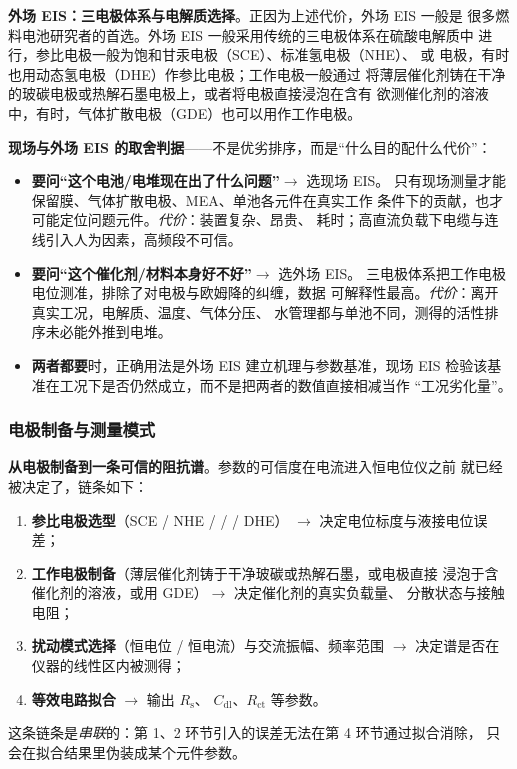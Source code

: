 \begin{measure}
\textbf{外场 EIS：三电极体系与电解质选择}。正因为上述代价，外场 EIS 一般是
很多燃料电池研究者的首选。外场 EIS 一般采用传统的三电极体系在硫酸电解质中
进行，参比电极一般为饱和甘汞电极（SCE）、标准氢电极（NHE）、
或  电极，有时也用动态氢电极（DHE）作参比电极；工作电极一般通过
将薄层催化剂铸在干净的玻碳电极或热解石墨电极上，或者将电极直接浸泡在含有
欲测催化剂的溶液中，有时，气体扩散电极（GDE）也可以用作工作电极。
\end{measure}

\begin{probout}
\textbf{现场与外场 EIS 的取舍判据}——不是优劣排序，而是“什么目的配什么代价”：

\begin{itemize}
  \item \textbf{要问“这个电池/电堆现在出了什么问题”}$\rightarrow$ 选现场 EIS。
        只有现场测量才能保留膜、气体扩散电极、MEA、单池各元件在真实工作
        条件下的贡献，也才可能定位问题元件。\emph{代价}：装置复杂、昂贵、
        耗时；高直流负载下电缆与连线引入人为因素，高频段不可信。
  \item \textbf{要问“这个催化剂/材料本身好不好”}$\rightarrow$ 选外场 EIS。
        三电极体系把工作电极电位测准，排除了对电极与欧姆降的纠缠，数据
        可解释性最高。\emph{代价}：离开真实工况，电解质、温度、气体分压、
        水管理都与单池不同，测得的活性排序未必能外推到电堆。
  \item \textbf{两者都要}时，正确用法是外场 EIS 建立机理与参数基准，现场 EIS
        检验该基准在工况下是否仍然成立，而不是把两者的数值直接相减当作
        “工况劣化量”。
\end{itemize}
\end{probout}

\subsubsection{电极制备与测量模式}

\begin{dataflow}
\textbf{从电极制备到一条可信的阻抗谱}。参数的可信度在电流进入恒电位仪之前
就已经被决定了，链条如下：

\begin{enumerate}
  \item \textbf{参比电极选型}（SCE / NHE /  /  / DHE）
        $\rightarrow$ 决定电位标度与液接电位误差；
  \item \textbf{工作电极制备}（薄层催化剂铸于干净玻碳或热解石墨，或电极直接
        浸泡于含催化剂的溶液，或用 GDE）$\rightarrow$ 决定催化剂的真实负载量、
        分散状态与接触电阻；
  \item \textbf{扰动模式选择}（恒电位 / 恒电流）与交流振幅、频率范围
        $\rightarrow$ 决定谱是否在仪器的线性区内被测得；
  \item \textbf{等效电路拟合} $\rightarrow$ 输出 $R_\mathrm{s}$、
        $C_\mathrm{dl}$、$R_\mathrm{ct}$ 等参数。
\end{enumerate}

这条链条是\emph{串联}的：第 1、2 环节引入的误差无法在第 4 环节通过拟合消除，
只会在拟合结果里伪装成某个元件参数。
\end{dataflow}

